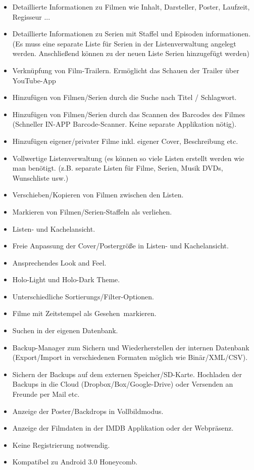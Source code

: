 \begin{itemize}
	\item Detaillierte Informationen zu Filmen wie Inhalt, Darsteller, Poster, Laufzeit, Regisseur ...
	\item Detaillierte Informationen zu Serien mit Staffel und Episoden informationen. (Es muss eine separate Liste für Serien in der Listenverwaltung angelegt werden. Anschließend können zu der neuen Liste Serien hinzugefügt werden)
	\item Verknüpfung von Film-Trailern. Ermöglicht das Schauen der Trailer über YouTube-App
	\item Hinzufügen von Filmen/Serien durch die Suche nach Titel / Schlagwort.
	\item Hinzufügen von Filmen/Serien durch das Scannen des Barcodes des Filmes (Schneller IN-APP Barcode-Scanner. Keine separate Applikation nötig).
	\item Hinzufügen eigener/privater Filme inkl. eigener Cover, Beschreibung etc.
	\item Vollwertige Listenverwaltung (es können so viele Listen erstellt werden wie man benötigt. (z.B. separate Listen für Filme, Serien, Musik DVDs, Wunschliste usw.)
	\item Verschieben/Kopieren von Filmen zwischen den Listen.
	\item Markieren von Filmen/Serien-Staffeln als verliehen.
	\item Listen- und Kachelansicht.
	\item Freie Anpassung der Cover/Postergröße in Listen- und Kachelansicht.
	\item Ansprechendes Look and Feel.
	\item Holo-Light und Holo-Dark Theme.
	\item Unterschiedliche Sortierungs/Filter-Optionen.
	\item Filme mit Zeitstempel als \glqq Gesehen\grqq \ markieren.
	\item Suchen in der eigenen Datenbank.
	\item Backup-Manager zum Sichern und Wiederherstellen der internen Datenbank (Export/Import in verschiedenen Formaten möglich wie Binär/XML/CSV).
	\item Sichern der Backups auf dem externen Speicher/SD-Karte. Hochladen der Backups in die Cloud (Dropbox/Box/Google-Drive) oder Versenden an Freunde per Mail etc.
	\item Anzeige der Poster/Backdrops in Vollbildmodus.
	\item Anzeige der Filmdaten in der IMDB Applikation oder der Webpräsenz.
	\item Keine Registrierung notwendig.
	\item Kompatibel zu Android 3.0 \glqq Honeycomb\grqq.
\end{itemize}

